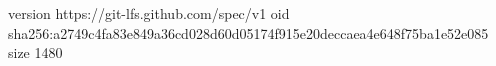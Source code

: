 version https://git-lfs.github.com/spec/v1
oid sha256:a2749c4fa83e849a36cd028d60d05174f915e20deccaea4e648f75ba1e52e085
size 1480
